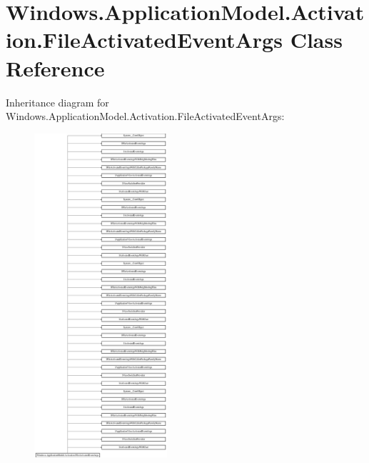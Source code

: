 \hypertarget{class_windows_1_1_application_model_1_1_activation_1_1_file_activated_event_args}{}\section{Windows.\+Application\+Model.\+Activation.\+File\+Activated\+Event\+Args Class Reference}
\label{class_windows_1_1_application_model_1_1_activation_1_1_file_activated_event_args}
Inheritance diagram for Windows.\+Application\+Model.\+Activation.\+File\+Activated\+Event\+Args\+:\begin{figure}[H]
\begin{center}
\leavevmode
\includegraphics[height=12.000000cm]{class_windows_1_1_application_model_1_1_activation_1_1_file_activated_event_args}
\end{center}
\end{figure}
